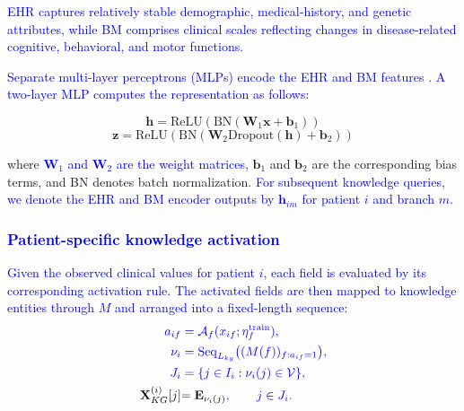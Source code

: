 \documentclass[lettersize,journal]{IEEEtran}
\begin{document}
    \textcolor{blue}{EHR captures relatively stable demographic, medical-history, and genetic attributes, while BM comprises clinical scales reflecting changes in disease-related cognitive, behavioral, and motor functions.}

    \textcolor{blue}{Separate multi-layer perceptrons (MLPs) encode the EHR and BM features} \cite{wang2024unity}. \textcolor{blue}{A two-layer MLP computes the representation as follows:}

    \begin{equation}
    \mathbf{h} = \text{ReLU}(\text{BN}(\mathbf{W}_1 \mathbf{x} + \mathbf{b}_1))
    \label{eq:MLP_1}
    \end{equation}
    \begin{equation}
    \mathbf{z} = \text{ReLU}(\text{BN}(\mathbf{W}_2 \text{Dropout}(\mathbf{h}) + \mathbf{b}_2))
    \label{eq:MLP_2}
    \end{equation}

    where \textcolor{blue}{$\mathbf{W}_1$ and $\mathbf{W}_2$ are the weight matrices}, $\mathbf{b}_1$ and $\mathbf{b}_2$ are the corresponding bias terms, and BN denotes batch normalization. \textcolor{blue}{For subsequent knowledge queries, we denote the EHR and BM encoder outputs by $\mathbf h_{im}$ for patient $i$ and branch $m$.}

\subsubsection{\textcolor{blue}{Patient-specific knowledge activation}}

\textcolor{blue}{Given the observed clinical values for patient $i$, each field is evaluated by its corresponding activation rule. The activated fields are then mapped to knowledge entities through $M$ and arranged into a fixed-length sequence:}
\begin{equation}
    {\color{blue}
    \begin{aligned}
    a_{if} &= \mathcal{A}_f(x_{if};\eta_f^{\mathrm{train}}),\\
    \nu_i &= \operatorname{Seq}_{L_{kg}}\bigl((M(f))_{f:a_{if}=1}\bigr),\\
    J_i &= \{j\in I_i:\nu_i(j)\in\mathcal{V}\},\\
    {\color{black}\mathbf{X}_{KG}^{(i)}[j]} &{\color{black}= \mathbf{E}_{\nu_i(j)}},\qquad j\in J_i.
    \end{aligned}
    }
    \label{eq:patient_activation}
\end{equation}
\end{document}
